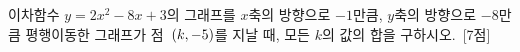 이차함수 $y=2x^2-8x+3$의 그래프를 $x$축의 방향으로 $-1$만큼, $y$축의 방향으로 $-8$만큼 평행이동한 그래프가 점~$(k{,}\mkern3mu\mathopen{}-5)$를 지날 때, 모든 $k$의 값의 합을 구하시오.~\mbox{\mbox{[7점]}}
